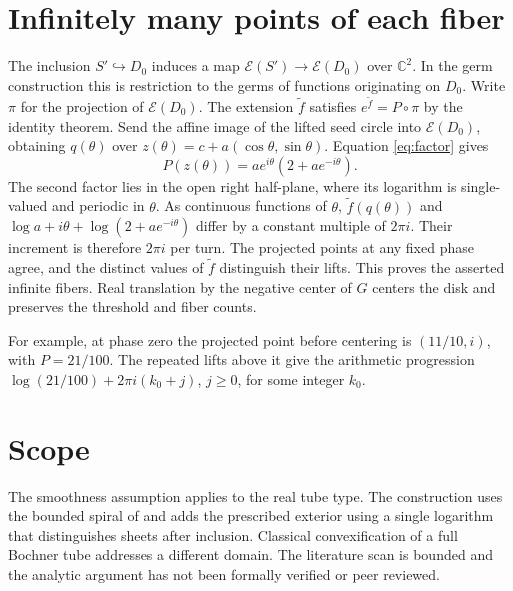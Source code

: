 \documentclass[11pt]{amsart}
\begin{document}
\section{Infinitely many points of each fiber}
The inclusion \(S'\hookrightarrow D_0\) induces a map \(\mathcal E(S')\to\mathcal E(D_0)\) over \(\mathbb C^2\). In the germ construction this is restriction to the germs of functions originating on \(D_0\). Write \(\pi\) for the projection of \(\mathcal E(D_0)\). The extension \(\widetilde f\) satisfies \(e^{\widetilde f}=P\circ\pi\) by the identity theorem. Send the affine image of the lifted seed circle into \(\mathcal E(D_0)\), obtaining \(q(\theta)\) over \(z(\theta)=c+a(\cos\theta,\sin\theta)\). Equation \eqref{eq:factor} gives
\[
 P(z(\theta))=a e^{i\theta}(2+a e^{-i\theta}).
\]
The second factor lies in the open right half-plane, where its logarithm is single-valued and periodic in \(\theta\). As continuous functions of \(\theta\), \(\widetilde f(q(\theta))\) and
\(\log a+i\theta+\log(2+a e^{-i\theta})\) differ by a constant multiple of \(2\pi i\). Their increment is therefore \(2\pi i\) per turn. The projected points at any fixed phase agree, and the distinct values of \(\widetilde f\) distinguish their lifts. This proves the asserted infinite fibers. Real translation by the negative center of \(G\) centers the disk and preserves the threshold and fiber counts.

For example, at phase zero the projected point before centering is \((11/10,i)\), with \(P=21/100\). The repeated lifts above it give the arithmetic progression \(\log(21/100)+2\pi i(k_0+j)\), \(j\ge0\), for some integer \(k_0\).

\section{Scope}
The smoothness assumption applies to the real tube type. The construction uses the bounded spiral of \cite{seed} and adds the prescribed exterior using a single logarithm that distinguishes sheets after inclusion. Classical convexification of a full Bochner tube addresses a different domain. The literature scan is bounded and the analytic argument has not been formally verified or peer reviewed.



\end{document}

